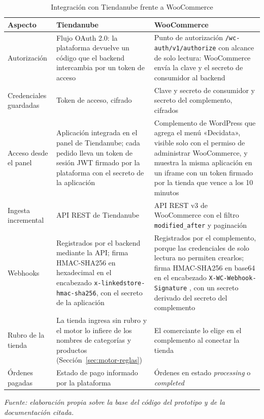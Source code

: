 \begin{table}[!htbp]
\centering
\caption{Integración con Tiendanube frente a WooCommerce}
\label{tab:multiplataforma-comparacion}
\renewcommand{\arraystretch}{1.3}
\footnotesize
\setlength{\tabcolsep}{4pt}
\begin{tabular}{|>{\raggedright\arraybackslash}m{2.3cm}|>{\raggedright\arraybackslash}m{5.4cm}|>{\raggedright\arraybackslash}m{5.4cm}|}
\hline
\textbf{Aspecto} & \textbf{Tiendanube} & \textbf{WooCommerce} \\
\hline
Autorización & Flujo OAuth 2.0: la plataforma devuelve un código que el backend intercambia por un token de acceso \parencite{TiendanubeAPI2024} & Punto de autorización \texttt{/wc-auth/v1/authorize} con alcance de solo lectura: WooCommerce envía la clave y el secreto de consumidor al backend \parencite{WooRestAPI2026} \\
\hline
Credenciales guardadas & Token de acceso, cifrado & Clave y secreto de consumidor y secreto del complemento, cifrados \\
\hline
Acceso desde el panel & Aplicación integrada en el panel de Tiendanube; cada pedido lleva un token de sesión JWT firmado por la plataforma con el secreto de la aplicación & Complemento de WordPress que agrega el menú «Decidata», visible solo con el permiso de administrar WooCommerce, y muestra la misma aplicación en un iframe con un token firmado por la tienda que vence a los 10 minutos \\
\hline
Ingesta incremental & API REST de Tiendanube & API REST v3 de WooCommerce con el filtro \texttt{modified\_after} y paginación \parencite{WooRestAPI2026} \\
\hline
Webhooks & Registrados por el backend mediante la API; firma HMAC-SHA256 en hexadecimal en el encabezado \texttt{x-linkedstore-hmac-sha256}, con el secreto de la aplicación & Registrados por el complemento, porque las credenciales de solo lectura no permiten crearlos; firma HMAC-SHA256 en base64 en el encabezado \texttt{X-WC-Webhook-Signature} \parencite{WooRestAPI2026}, con un secreto derivado del secreto del complemento \\
\hline
Rubro de la tienda & La tienda ingresa sin rubro y el motor lo infiere de los nombres de categorías y productos (Sección~\ref{sec:motor-reglas}) & El comerciante lo elige en el complemento al conectar la tienda \\
\hline
Órdenes pagadas & Estado de pago informado por la plataforma & Órdenes en estado \emph{processing} o \emph{completed} \\
\hline
\end{tabular}

\smallskip
\noindent\textit{Fuente: elaboración propia sobre la base del código del prototipo y de la documentación citada.}
\end{table}

